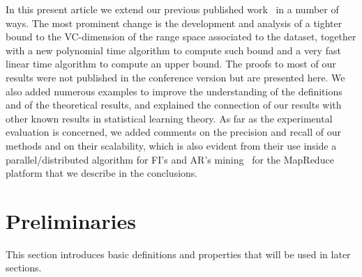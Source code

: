 In this present article we extend our previous published work~\citep{RiondatoU12}
in a number of ways. The most prominent change is the development and analysis
of a tighter bound to the VC-dimension of the range space associated to the
dataset, together with a new polynomial time algorithm to compute such bound and
a very fast linear time algorithm to compute an upper bound. The proofs to most
of our results were not published in the conference version but are presented
here. We also added numerous examples to improve the understanding of the
definitions and of the theoretical results, and explained the connection of our
results with other known results in statistical learning theory. As far as the
experimental evaluation is concerned, we added comments on the precision and
recall of our methods and on their scalability, which is also evident from their
use inside a parallel/distributed algorithm for FI's and AR's
mining~\citep{RiondatoDFU12} for the MapReduce~\citep{DeanS04} platform that we
describe in the conclusions.

\section{Preliminaries}\label{sec:vcmineprelim}

This section introduces basic definitions and properties that will be used in later sections.

